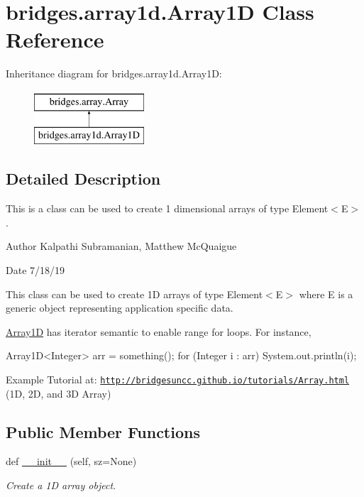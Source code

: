 \hypertarget{classbridges_1_1array1d_1_1_array1_d}{}\section{bridges.\+array1d.\+Array1D Class Reference}
\label{classbridges_1_1array1d_1_1_array1_d}
Inheritance diagram for bridges.\+array1d.\+Array1D\+:\begin{figure}[H]
\begin{center}
\leavevmode
\includegraphics[height=2.000000cm]{classbridges_1_1array1d_1_1_array1_d}
\end{center}
\end{figure}


\subsection{Detailed Description}
This is a class can be used to create 1 dimensional arrays of type Element$<$\+E$>$. 

\begin{DoxyAuthor}{Author}
Kalpathi Subramanian, Matthew Mc\+Quaigue
\end{DoxyAuthor}
\begin{DoxyDate}{Date}
7/18/19
\end{DoxyDate}
This class can be used to create 1D arrays of type Element$<$\+E$>$ where E is a generic object representing application specific data.

\mbox{\hyperlink{classbridges_1_1array1d_1_1_array1_d}{Array1D}} has iterator semantic to enable range for loops. For instance,


\begin{DoxyCode}
Array1D<Integer> arr = something();
\textcolor{keywordflow}{for} (Integer i : arr)
    System.out.println(i);
\end{DoxyCode}


Example Tutorial at\+: \href{http://bridgesuncc.github.io/tutorials/Array.html}{\tt http\+://bridgesuncc.\+github.\+io/tutorials/\+Array.\+html} (1D, 2D, and 3D Array)~\newline
 \subsection*{Public Member Functions}
\begin{DoxyCompactItemize}
\item 
def \mbox{\hyperlink{classbridges_1_1array1d_1_1_array1_d_ac3bc432b5a53c890871a5884c08a6fa2}{\+\_\+\+\_\+init\+\_\+\+\_\+}} (self, sz=None)
\begin{DoxyCompactList}\small\item\em Create a 1D array object. \end{DoxyCompactList}\end{DoxyCompactItemize}
